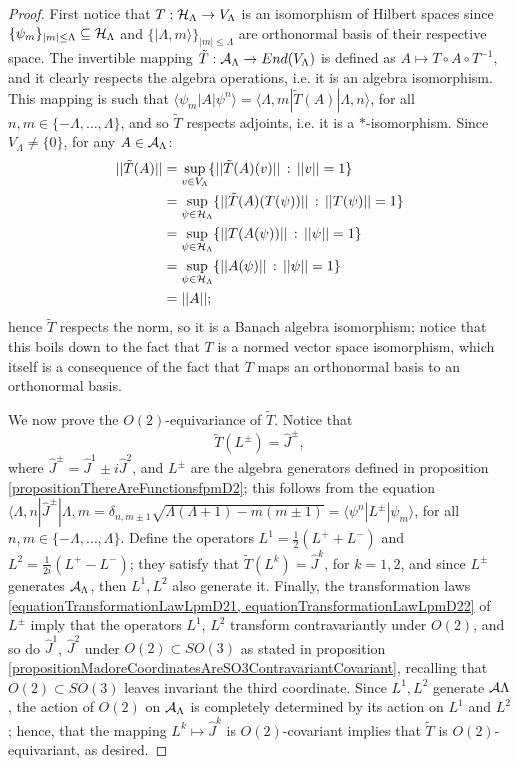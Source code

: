 \begin{proof}
First notice that $T: \mathcal H_\Lambda \to V_\Lambda$ is an isomorphism of Hilbert spaces since $\{\psi_m\}_{|m| \leq \Lambda} \subseteq \mathcal H_\Lambda$ and $\{|\Lambda, m\rangle\}_{|m| \leq \Lambda}$ are orthonormal basis of their respective space. The invertible mapping $\tilde T: \mathcal A_\Lambda \to End(V_\Lambda)$ is defined as $A \mapsto T \circ A \circ T^{-1}$, and it clearly respects the algebra operations, i.e. it is an algebra isomorphism. This mapping is such that $\langle 
\psi_m | A | \psi^n \rangle = \langle \Lambda, m | \tilde T(A) | \Lambda, n\rangle$, for all $n, m \in \{-\Lambda, \dots, \Lambda\}$, and so $\tilde T$ respects adjoints, i.e. it is a $*$-isomorphism. Since $V_\Lambda \neq \{0\}$, for any $A \in \mathcal A_\Lambda$:
\begin{align*}
    ||\tilde T (A)|| &= \sup_{v \in V_\Lambda} \{||\tilde T(A)(v)||\,:\, ||v|| = 1\} \\
    &= \sup_{\psi \in \mathcal H_\Lambda} \{||\tilde T(A)(T(\psi))||\,:\, ||T(\psi)|| = 1\} \\
    &= \sup_{\psi \in \mathcal H_\Lambda} \{||T(A(\psi))||\,:\, ||\psi|| = 1\} \\
    &= \sup_{\psi \in \mathcal H_\Lambda} \{||A(\psi)||\,:\, ||\psi|| = 1\}\\
    &= ||A||;
\end{align*}
hence $\tilde T$ respects the norm, so it is a Banach algebra isomorphism; notice that this boils down to the fact that $T$ is a normed vector space isomorphism, which itself is a consequence of the fact that $T$ maps an orthonormal basis to an orthonormal basis.

We now prove the $O(2)$-equivariance of $\tilde T$. Notice that 
\begin{equation}
    \tilde T(L^\pm) = \hat J^\pm,
\end{equation}
where $\hat J^\pm = \hat J^1 \pm i \hat J^2$, and $L^\pm$ are the algebra generators defined in proposition \ref{propositionThereAreFunctionsfpmD2}; this follows from the equation $\langle \Lambda, n| \hat J^\pm |\Lambda, m = \delta_{n, m \pm 1} \sqrt{\Lambda(\Lambda + 1) - m(m \pm 1)} = \langle \psi^n | L^\pm | \psi_m \rangle$, for all $n, m \in \{-\Lambda, \dots, \Lambda\}$. Define the operators $L^1 = \frac{1}{2}(L^+ + L^-)$ and $L^2 = \frac{1}{2i}(L^+ - L^-)$; they satisfy that $\tilde T(L^k) = \hat J^k$, for $k = 1, 2$, and since $L^\pm$ generates $\mathcal A_\Lambda$, then $L^1, L^2$ also generate it. Finally, the transformation laws \eqref{equationTransformationLawLpmD21, equationTransformationLawLpmD22} of $L^\pm$ imply that the operators $L^1$, $L^2$ transform contravariantly under $O(2)$, and so do $\hat J^1$, $\hat J^2$ under $O(2) \subset SO(3)$ as stated in proposition \ref{propositionMadoreCoordinatesAreSO3ContravariantCovariant}, recalling that $O(2) \subset SO(3)$ leaves invariant the third coordinate. Since $L^1, L^2$ generate $\mathcal A\Lambda$, the action of $O(2)$ on $\mathcal A_\Lambda$ is completely determined by its action on $L^1$ and $L^2$; hence, that the mapping $L^k \mapsto \hat J^k$ is $O(2)$-covariant implies that $\tilde T$ is $O(2)$-equivariant, as desired.


\end{proof}
